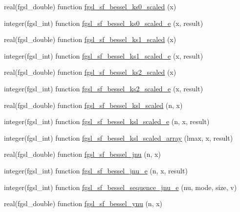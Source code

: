 \begin{DoxyCompactItemize}
\item 
real(fgsl\-\_\-double) function \hyperlink{specfunc_8finc_a41c2af16b0cc8e0306bf69674ecd76f8}{fgsl\-\_\-sf\-\_\-bessel\-\_\-ks0\-\_\-scaled} (x)
\item 
integer(fgsl\-\_\-int) function \hyperlink{specfunc_8finc_a036ee716e4369b0904c5283cb0a38866}{fgsl\-\_\-sf\-\_\-bessel\-\_\-ks0\-\_\-scaled\-\_\-e} (x, result)
\item 
real(fgsl\-\_\-double) function \hyperlink{specfunc_8finc_abbd61ad4dae926a7a5ad87a77d80ff83}{fgsl\-\_\-sf\-\_\-bessel\-\_\-ks1\-\_\-scaled} (x)
\item 
integer(fgsl\-\_\-int) function \hyperlink{specfunc_8finc_af142a77938198971f45eb2898c019836}{fgsl\-\_\-sf\-\_\-bessel\-\_\-ks1\-\_\-scaled\-\_\-e} (x, result)
\item 
real(fgsl\-\_\-double) function \hyperlink{specfunc_8finc_ad9186c32d03ac512165c1555935a1d3b}{fgsl\-\_\-sf\-\_\-bessel\-\_\-ks2\-\_\-scaled} (x)
\item 
integer(fgsl\-\_\-int) function \hyperlink{specfunc_8finc_a4fb8e3c619e4c3cb21df907b65e224f2}{fgsl\-\_\-sf\-\_\-bessel\-\_\-ks2\-\_\-scaled\-\_\-e} (x, result)
\item 
real(fgsl\-\_\-double) function \hyperlink{specfunc_8finc_af51da4a346dc5348e883162b1e2a7e34}{fgsl\-\_\-sf\-\_\-bessel\-\_\-ksl\-\_\-scaled} (n, x)
\item 
integer(fgsl\-\_\-int) function \hyperlink{specfunc_8finc_a22e67d04021e66154f4b788f89aabe5e}{fgsl\-\_\-sf\-\_\-bessel\-\_\-ksl\-\_\-scaled\-\_\-e} (n, x, result)
\item 
integer(fgsl\-\_\-int) function \hyperlink{specfunc_8finc_a670c5d38f6b7f68a55eb4c548b55b3e7}{fgsl\-\_\-sf\-\_\-bessel\-\_\-ksl\-\_\-scaled\-\_\-array} (lmax, x, result)
\item 
real(fgsl\-\_\-double) function \hyperlink{specfunc_8finc_a3d7685e959d0f63da798c30a353f1ab7}{fgsl\-\_\-sf\-\_\-bessel\-\_\-jnu} (n, x)
\item 
integer(fgsl\-\_\-int) function \hyperlink{specfunc_8finc_af5b4077bf8637dff5f36872c4f3b5ec7}{fgsl\-\_\-sf\-\_\-bessel\-\_\-jnu\-\_\-e} (n, x, result)
\item 
integer(fgsl\-\_\-int) function \hyperlink{specfunc_8finc_a1144fd4cf0b88775bb9fbb35835e550c}{fgsl\-\_\-sf\-\_\-bessel\-\_\-sequence\-\_\-jnu\-\_\-e} (nu, mode, size, v)
\item 
real(fgsl\-\_\-double) function \hyperlink{specfunc_8finc_af17a614beaf7642fa1a49fa951d331c0}{fgsl\-\_\-sf\-\_\-bessel\-\_\-ynu} (n, x)
\item 

\end{DoxyCompactItemize}
